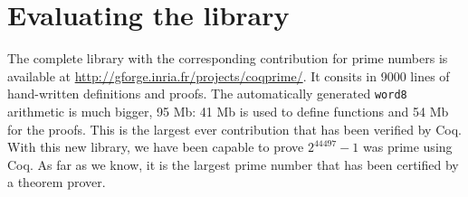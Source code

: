 \section{Evaluating the library \label{bench}}

The complete library with the corresponding contribution for prime numbers is available at \url{http://gforge.inria.fr/projects/coqprime/}. It consits in 9000 lines of hand-written
definitions and proofs. The automatically generated {\tt word8} arithmetic is much bigger,
95 Mb: 41 Mb is used to define functions and 54 Mb for the proofs. This is the largest ever
contribution that has been verified by {\sc Coq}. With this new library, we have been capable to
prove $2^{44497} - 1$ was prime using {\sc Coq}. As far as we know, it is the largest 
prime number  that has been certified by a theorem prover.

